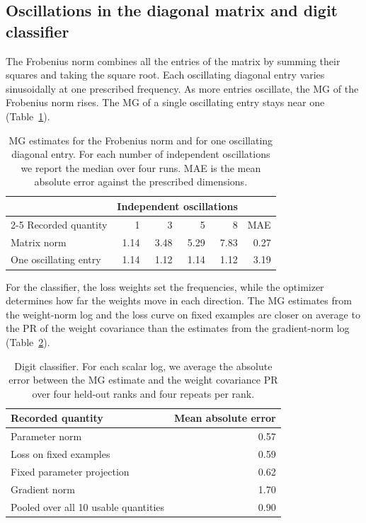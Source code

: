 {\subsection[Oscillations in the diagonal matrix and digit classifier]{Oscillations in the diagonal matrix and digit classifier}\label{app:controlled-observables}
The Frobenius norm combines all the entries of the matrix by summing their squares and taking the square root. Each oscillating diagonal entry varies sinusoidally at one prescribed frequency. As more entries oscillate, the MG of the Frobenius norm rises. The MG of a single oscillating entry stays near one (Table~\ref{tab:matrix-observations}).

\begin{table}[!htbp]
\centering\small
\caption{MG estimates for the Frobenius norm and for one oscillating diagonal entry. For each number of independent oscillations we report the median over four runs. MAE is the mean absolute error against the prescribed dimensions.}
\label{tab:matrix-observations}
\begin{tabular}{@{}lrrrrr@{}}
\toprule
 & \multicolumn{4}{c}{Independent oscillations} & \\
\cmidrule(lr){2-5}
Recorded quantity & 1 & 3 & 5 & 8 & MAE \\
\midrule
Matrix norm & 1.14 & 3.48 & 5.29 & 7.83 & 0.27 \\
One oscillating entry & 1.14 & 1.12 & 1.14 & 1.12 & 3.19 \\
\bottomrule
\end{tabular}
\end{table}

For the classifier, the loss weights set the frequencies, while the optimizer determines how far the weights move in each direction. The MG estimates from the weight-norm log and the loss curve on fixed examples are closer on average to the PR of the weight covariance than the estimates from the gradient-norm log (Table~\ref{tab:synthetic-errors}).


\begin{table}[htbp]
\centering\small
\setlength{\tabcolsep}{2.5pt}
\caption{Digit classifier. For each scalar log, we average the absolute error between the MG estimate and the weight covariance PR over four held-out ranks and four repeats per rank.}
\label{tab:synthetic-errors}
\begin{tabular}{lr}
\toprule
Recorded quantity & Mean absolute error \\
\midrule
Parameter norm & 0.57 \\
Loss on fixed examples & 0.59 \\
Fixed parameter projection & 0.62 \\
Gradient norm & 1.70 \\
\midrule
Pooled over all 10 usable quantities & 0.90 \\
\bottomrule
\end{tabular}
\end{table}

}

